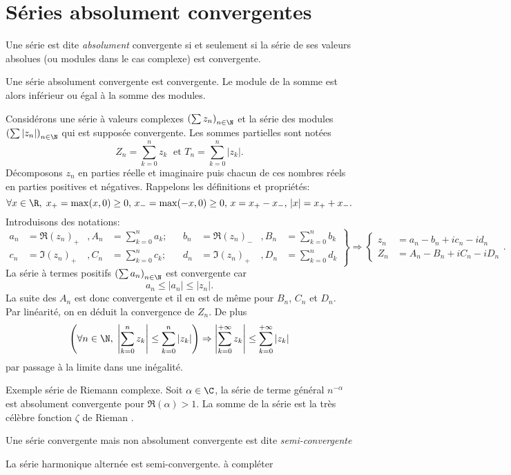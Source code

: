\section{Séries absolument convergentes}
\begin{defi}
  Une série est dite \emph{absolument} convergente si et seulement si la série de ses valeurs absolues (ou modules dans le cas complexe) est convergente.
\end{defi}
\begin{prop}
  Une série absolument convergente est convergente. Le module de la somme est alors inférieur ou égal à la somme des modules.
\end{prop}
\begin{demo}
Considérons une série à valeurs complexes $\left( \sum z_n\right)_{n \in \N}$ et la série des modules $\left( \sum |z_n|\right)_{n \in \N}$ qui est supposée convergente. Les sommes partielles sont notées
\[
 Z_n = \sum_{k=0}^n z_k\; \text{ et } T_n = \sum_{k=0}^n |z_k|.
\]
Décomposons $z_n$ en parties réelle et imaginaire puis chacun de ces nombres réels en parties positives et négatives. Rappelons les définitions et propriétés:
\[
 \forall x \in \R,\; x_+ = \max(x,0)\geq 0, \, x_- = \max(-x,0) \geq 0,\, x = x_+ - x_-,\, |x| = x_+ + x_-.  
\]
Introduisons des notations:
\[
\left. 
\begin{aligned}
 a_n &= \Re(z_n)_+ &, A_n &= \sum_{k=0}^n a_k ; & &
 b_n &= \Re(z_n)_- &, B_n &= \sum_{k=0}^n b_k \\
 c_n &= \Im(z_n)_+ &, C_n &= \sum_{k=0}^n c_k ; & &
 d_n &= \Im(z_n)_+ &, D_n &= \sum_{k=0}^n d_k 
\end{aligned}
\right\rbrace \Rightarrow 
\left\lbrace 
\begin{aligned}
z_n &= a_n - b_n + ic_n -id_n \\
Z_n &= A_n - B_n + iC_n -iD_n
\end{aligned}
\right. .
\]
La série à termes positifs $\left( \sum a_n\right)_{n \in \N}$ est convergente car 
\[
 a_n \leq |a_n| \leq |z_n| .
\]
La suite des $A_n$ est donc convergente et il en est de même pour $B_n$, $C_n$ et $D_n$. Par linéarité, on en déduit la convergence de $Z_n$.\newline
De plus
\[
 \left( \forall n \in \N, \; \left| \sum_{k=0}^{n} z_k \right| \leq \sum_{k=0}^{n} |z_k|\right)  
 \Rightarrow 
 \left| \sum_{k=0}^{+\infty} z_k \right| \leq \sum_{k=0}^{+\infty} |z_k|
\]
par passage à la limite dans une inégalité.
\end{demo}
Exemple série de Riemann complexe. Soit $\alpha\in \C$, la série de terme général $n^{-\alpha}$ est absolument convergente pour $\Re(\alpha)>1$. La somme de la série est la très célèbre fonction $\zeta$ de Rieman .
\begin{defi}
  Une série convergente mais non absolument convergente est dite \emph{semi-convergente}
\end{defi}
\begin{exple}
La série harmonique alternée est semi-convergente.
à compléter 
\end{exple}

